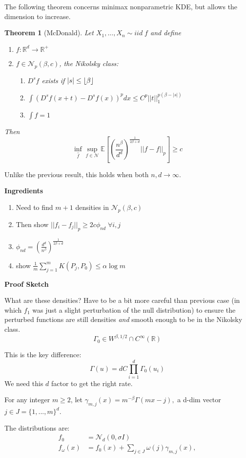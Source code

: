 \documentclass[10pt]{article}
\newcounter{lecnum}
\newtheorem{theorem}{Theorem}[lecnum]
\newcommand{\normal}{\mathcal{N}}
\renewcommand{\hat}{\widehat}
\newcommand{\E}[1]{\mathbb{E}\!\left[#1\right]}
\newcommand{\sobolev}[2]{W^{#1,#2}}
\newcommand{\R}{\mathbb{R}}
\newcommand{\N}{\mathcal{N}}
\DeclarePairedDelimiter\floor{\lfloor}{\rfloor}
\begin{document}
The following theorem concerns minimax nonparametric KDE, but allows the dimension to increase.

\begin{theorem}[McDonald]
Let $X_1,...,X_n \sim iid\; f$ and define
\begin{enumerate}
\item $f:\R^d\to\R^+$
\item $f\in\N_p(\beta,c)$, the Nikolsky class: 
\begin{enumerate}
\item $D^s f$ exists if $|s|\leq \floor{\beta}$
\item $\int(D^sf(x+t)-D^sf(x))^pdx \leq C^p||t||_1^{p(\beta-|s|)}$
\item $\int f = 1$
\end{enumerate}
\end{enumerate}
Then 
\[
\inf_{ \hat{f} } \sup_{f\in\N} 
	\E{ 
			\left( 
				\frac{n^\beta}{d^d}
			 \right) 
				^ { \frac{1}{2\beta+d}}  
			||f-\hat{f}||_p 
		}
		 \geq c
\]
\end{theorem}

Unlike the previous result, this holds when both $n,d\to\infty$.

\textbf{Ingredients}
\begin{enumerate}
\item Need to find $m+1$ densities in $\N_p(\beta,c)$
\item Then show $||f_i-f_j||_p\geq 2c \phi_{nd} \;\forall i,j$
\item $\phi_{nd} = (\frac{d^d}{n^\beta})^{\frac{1}{2\beta+d}}$
\item show $\frac{1}{m}\sum_{j=1}^mK(P_j,P_0)\leq \alpha\log m$
\end{enumerate}

\textbf{Proof Sketch}

What are these densities?  Have to be a bit more careful than previous case (in which $f_1$ was just a slight perturbation of the null distribution) to ensure the perturbed functions are still densities \textit{and} smooth enough to be in the Nikolsky class.
\[\Gamma_0\in\sobolev{\beta}{1/2} \cap C^\infty(\R)\]

This is the key difference:
\[\Gamma(u) = dC\prod_{i=1}^d\Gamma_0(u_i) \]
We need this $d$ factor to get the right rate.

For any integer $m\geq2$, let $\gamma_{m,j}(x)=m^{-\beta}\Gamma(mx-j),$ a d-dim vector $j\in J=\{1,...,m\}^d$.

The distributions are:
\begin{align*}
f_0 &= \normal_d(0,\sigma I)\\
f_\omega(x) &= 
	f_0(x) 
	+ \sum_{j\in J} \omega(j) \gamma_{m,j}(x),\\
\end{align*}
\end{document}
